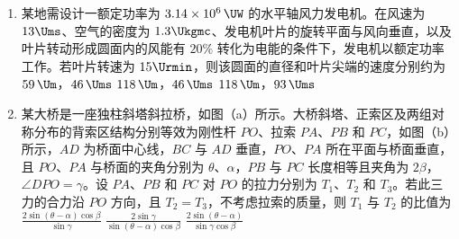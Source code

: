 \documentclass[\gkver]{gaokaozhenti}
\begin{document}
\begin{enumerate}
{A．斜直线与水平线连接处的斜率发生突变，故 A 错误；

B．各段光滑相接，斜率随时间连续变化，故 B 正确；

C．图线在中间的匀速段两端出现折角，斜率发生突变，故 C 错误；

D．由最初的匀速段进入加速段，以及由减速段进入最后的匀速段时，斜率发生突变，故 D 错误。

故选 B。
}

\item
某地需设计一额定功率为 $3.14\times10^{6}\,\UW$ 的水平轴风力发电机。在风速为 $13\Ums$、空气的密度为 $1.3\Ukgmc$、发电机叶片的旋转平面与风向垂直，以及叶片转动形成圆面内的风能有 $20\%$ 转化为电能的条件下，发电机以额定功率工作。若叶片转速为 $15\Urmin$，则该圆面的直径和叶片尖端的速度分别约为
{$59\,\Um$，$46\,\Ums$}
{$118\,\Um$，$46\,\Ums$}
{$118\,\Um$，$93\,\Ums$}

\item
某大桥是一座独柱斜塔斜拉桥，如图（a）所示。大桥斜塔、正索区及两组对称分布的背索区结构分别等效为刚性杆 $PO$、拉索 $PA$、$PB$ 和 $PC$，如图（b）所示，$AD$ 为桥面中心线，$BC$ 与 $AD$ 垂直，$PO$、$PA$ 所在平面与桥面垂直，且 $PO$、$PA$ 与桥面的夹角分别为 $\theta$、$\alpha$，$PB$ 与 $PC$ 长度相等且夹角为 $2\beta$，$\angle DPO=\gamma$。设 $PA$、$PB$ 和 $PC$ 对 $PO$ 的拉力分别为 $T_1$、$T_2$ 和 $T_3$。若此三力的合力沿 $PO$ 方向，且 $T_2=T_3$，不考虑拉索的质量，则 $T_1$ 与 $T_2$ 的比值为
\fourchoices[answer=A]
{$\frac{2\sin\gamma\cos\beta}{\sin(\theta-\alpha)}$}
{$\frac{2\sin(\theta-\alpha)\cos\beta}{\sin\gamma}$}
{$\frac{2\sin\gamma}{\sin(\theta-\alpha)\cos\beta}$}
{$\frac{2\sin(\theta-\alpha)}{\sin\gamma\cos\beta}$}
\end{enumerate}
\end{document}
